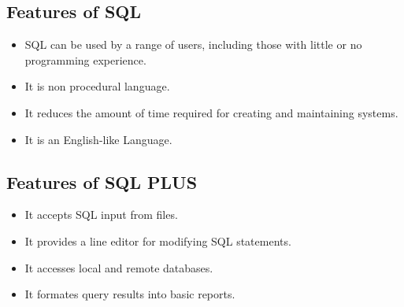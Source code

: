 \documentclass[11pt]{article}
\begin{document}
\subsection{Features of SQL}
\label{sec:org1408521}
\begin{itemize}
\item SQL can be used by a range of users, including those with little or no programming experience.
\item It is non procedural language.
\item It reduces the amount of time required for creating and maintaining systems.
\item It is an English-like Language.
\end{itemize}
\subsection{Features of SQL PLUS}
\label{sec:orgb5a05dd}
\begin{itemize}
\item It accepts SQL input from files.
\item It provides a line editor for modifying SQL statements.
\item It accesses local and remote databases.
\item It formates query results into basic reports.
\end{itemize}
\end{document}

